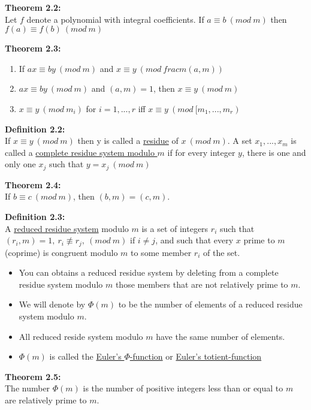 \documentclass[a4paper]{article}
\begin{document}
\textbf{Theorem 2.2:}\\
Let $f$ denote a polynomial with integral coefficients. If $a\equiv b\ (mod\ m)$ then $f(a)\equiv f(b)\ (mod\ m)$

\textbf{Theorem 2.3:}
\begin{enumerate}
    \item If $ax\equiv by\ (mod\ m)$ and $x\equiv y\ (mod\ frac{m}{(a,m)})$
    \item $ax\equiv by\ (mod\ m)$ and $(a,m)=1$, then $x\equiv y\ (mod\ m)$
    \item $x\equiv y\ (mod\ m_i)$ for $i=1,...,r$ iff $x\equiv y\ (mod\ [m_1,...,m_r)$
\end{enumerate}


\textbf{Definition 2.2:}\\
If $x\equiv y\ (mod\ m)$ then y is called a \underline{residue} of $x\ (mod\ m)$. A set $x_1,...,x_m$ is called a \underline{complete residue system modulo $m$} if for every integer $y$, there is one and only one $x_j$ such that $y=x_j\ (mod\ m)$

\textbf{Theorem 2.4:}\\
If $b\equiv c\ (mod\ m)$, then $(b,m)=(c,m)$.

\textbf{Definition 2.3:}\\
A \underline{reduced residue system} modulo $m$ is a set of integers $r_i$ such that\\ $(r_i,m)=1,\ r_i\not\equiv r_j,\ (mod\ m)$ if $i\neq j$, and such that every $x$ prime to $m$ (coprime) is congruent modulo $m$ to some member $r_i$ of the set.
\begin{itemize}
    \item You can obtains a reduced residue system by deleting from a complete residue system modulo $m$ those members that are not relatively prime to $m$.
    \item We will denote by $\Phi(m)$ to be the number of elements of a reduced residue system modulo $m$.
    \item All reduced reside system modulo $m$ have the same number of elements.
    \item $\Phi(m)$ is called the \underline{Euler's $\Phi$-function} or \underline{Euler's totient-function}
\end{itemize}

\textbf{Theorem 2.5:}\\
The number $\Phi(m)$ is the number of positive integers less than or equal to $m$ are relatively prime to $m$.
\end{document}
